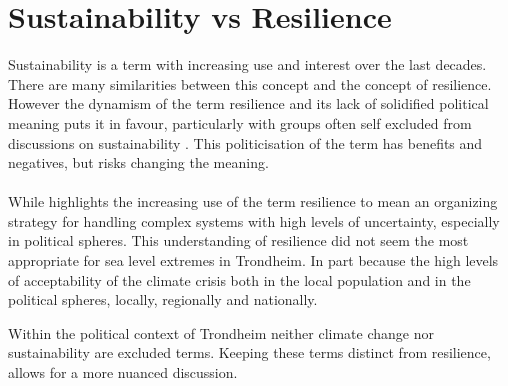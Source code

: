 \section{Sustainability vs Resilience}

Sustainability is a term with increasing use and interest over the last decades. There are many similarities between this concept and the concept of resilience. However the dynamism of the term resilience and its lack of solidified political meaning puts it in favour, particularly with groups often self excluded from discussions on sustainability \cite{moser_turbulent_2019}. This politicisation of the term has benefits and negatives, but risks changing the meaning.
\paragraph{}

While \cite{moser_turbulent_2019} highlights the increasing use of the term resilience to mean an organizing strategy for handling complex systems with high levels of uncertainty, especially in political spheres. This understanding of resilience did not seem the most appropriate for sea level extremes in Trondheim. In part because the high levels of acceptability of the climate crisis both in the local population and in the political spheres, locally, regionally and nationally. 

Within the political context of Trondheim neither climate change nor sustainability are excluded terms. Keeping these terms distinct from resilience, allows for a more nuanced discussion.







